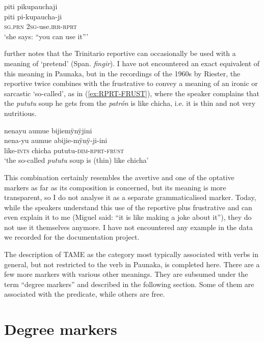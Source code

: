 \ea\label{ex:RPRT-CORR}
\begingl 
\glpreamble piti pikupauchaji\\
\gla piti pi-kupaucha-ji\\ 
\textsc{sg.prn} 2\textsc{sg}-use.\textsc{irr}-\textsc{rprt}\\ 
\glft ‘she says: “you can use it”’
\xe

\citet[83]{Rose2014a} further notes that the Trinitario reportive can occasionally be used with a meaning of ‘pretend’ (Span. \textit{fingir}). I have not encountered an exact equivalent of this meaning in Paunaka, but in the recordings of the 1960s by Riester, the reportive twice combines with the frustrative to convey a meaning of an ironic or sarcastic ‘so-called’, as in (\ref{ex:RPRT-FRUST}), where the speaker complains that the \textit{pututu} soup he gets from the \textit{patrón} is like chicha, i.e. it is thin and not very nutritious.

\ea\label{ex:RPRT-FRUST}
\begingl 
\glpreamble nenayu aumue bijiemÿnÿjini\\
\gla nena-yu aumue abijie-mÿnÿ-ji-ini\\ 
\glb like-\textsc{ints} chicha pututu-\textsc{dim}-\textsc{rprt}-\textsc{frust}\\ 
\glft ‘the so-called \textit{pututu} soup is (thin) like chicha’
\trailingcitation{[nxx-p630101g-2.58]}
\xe

This combination certainly resembles the avertive and one of the optative markers as far as its composition is concerned, but its meaning is more transparent, so I do not analyse it as a separate grammaticalised marker. Today, while the speakers understand this use of the reportive plus frustrative and can even explain it to me (Miguel said: “it is like making a joke about it”), they do not use it themselves anymore. I have not encountered any example in the data we recorded for the documentation project.  

The description of TAME as the category most typically associated with verbs in general, but not restricted to the verb in Paunaka, is completed here. There are a few more markers with various other meanings. They are subsumed under the term “degree markers” and described in the following section. Some of them are associated with the predicate, while others are free.


\section{Degree markers}\label{sec:MiscellaneousMarkers}

